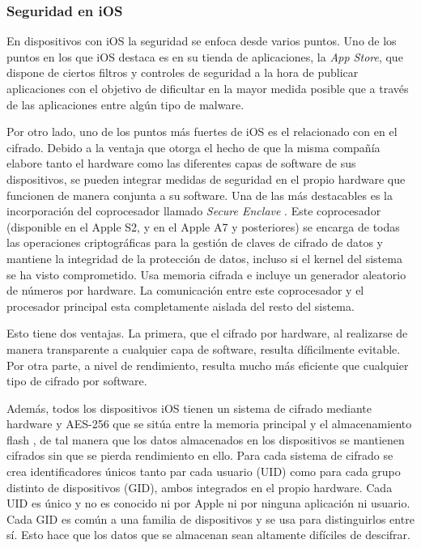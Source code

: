 \subsubsection{Seguridad en iOS}

En dispositivos con iOS la seguridad se enfoca desde varios puntos. Uno de los puntos en los que iOS destaca es en su tienda de aplicaciones, la \textit{App Store}, que dispone de ciertos filtros y controles de seguridad a la hora de publicar aplicaciones con el objetivo de dificultar en la mayor medida posible que a través de las aplicaciones entre algún tipo de malware.

Por otro lado, uno de los puntos más fuertes de iOS es el relacionado con en el cifrado. Debido a la ventaja que otorga el hecho de que la misma compañía elabore tanto el hardware como las diferentes capas de software de sus dispositivos, se pueden integrar medidas de seguridad en el propio hardware que funcionen de manera conjunta a su software. Una de las más destacables es la incorporación del coprocesador llamado \emph{Secure Enclave} \cite{ios-sec-guide}. Este coprocesador (disponible en el Apple S2, y en el Apple A7 y posteriores) se encarga de todas las operaciones criptográficas para la gestión de claves de cifrado de datos y mantiene la integridad de la protección de datos, incluso si el kernel del sistema se ha visto comprometido. Usa memoria cifrada e incluye un generador aleatorio de números por hardware. La comunicación entre este coprocesador y el procesador principal esta completamente aislada del resto del sistema.

Esto tiene dos ventajas. La primera, que el cifrado por hardware, al realizarse de manera transparente a cualquier capa de software, resulta díficilmente evitable. Por otra parte, a nivel de rendimiento, resulta mucho más eficiente que cualquier tipo de cifrado por software.

Además, todos los dispositivos iOS tienen un sistema de cifrado mediante hardware y AES-256 que se sitúa entre la memoria principal y el almacenamiento flash \cite{ios-sec-guide}, de tal manera que los datos almacenados en los dispositivos se mantienen cifrados sin que se pierda rendimiento en ello. Para cada sistema de cifrado se crea identificadores únicos tanto par cada usuario (UID) como para cada grupo distinto de dispositivos (GID), ambos integrados en el propio hardware. Cada UID es único y no es conocido ni por Apple ni por ninguna aplicación ni usuario. Cada GID es común a una familia de dispositivos y se usa para distinguirlos entre sí. Esto hace que los datos que se almacenan sean altamente difíciles de descifrar.

